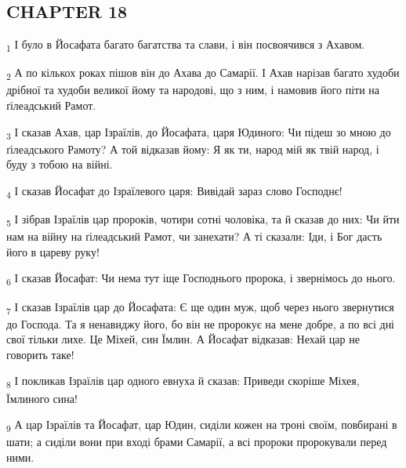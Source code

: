 \subsection{CHAPTER 18}
\begin{tcolorbox}
\textsubscript{1} І було в Йосафата багато багатства та слави, і він посвоячився з Ахавом.
\end{tcolorbox}
\begin{tcolorbox}
\textsubscript{2} А по кількох роках пішов він до Ахава до Самарії. І Ахав нарізав багато худоби дрібної та худоби великої йому та народові, що з ним, і намовив його піти на ґілеадський Рамот.
\end{tcolorbox}
\begin{tcolorbox}
\textsubscript{3} І сказав Ахав, цар Ізраїлів, до Йосафата, царя Юдиного: Чи підеш зо мною до ґілеадського Рамоту? А той відказав йому: Я як ти, народ мій як твій народ, і буду з тобою на війні.
\end{tcolorbox}
\begin{tcolorbox}
\textsubscript{4} І сказав Йосафат до Ізраїлевого царя: Вивідай зараз слово Господнє!
\end{tcolorbox}
\begin{tcolorbox}
\textsubscript{5} І зібрав Ізраїлів цар пророків, чотири сотні чоловіка, та й сказав до них: Чи йти нам на війну на ґілеадський Рамот, чи занехати? А ті сказали: Іди, і Бог дасть його в цареву руку!
\end{tcolorbox}
\begin{tcolorbox}
\textsubscript{6} І сказав Йосафат: Чи нема тут іще Господнього пророка, і звернімось до нього.
\end{tcolorbox}
\begin{tcolorbox}
\textsubscript{7} І сказав Ізраїлів цар до Йосафата: Є ще один муж, щоб через нього звернутися до Господа. Та я ненавиджу його, бо він не пророкує на мене добре, а по всі дні свої тільки лихе. Це Міхей, син Їмлин. А Йосафат відказав: Нехай цар не говорить таке!
\end{tcolorbox}
\begin{tcolorbox}
\textsubscript{8} І покликав Ізраїлів цар одного евнуха й сказав: Приведи скоріше Міхея, Їмлиного сина!
\end{tcolorbox}
\begin{tcolorbox}
\textsubscript{9} А цар Ізраїлів та Йосафат, цар Юдин, сиділи кожен на троні своїм, повбирані в шати; а сиділи вони при вході брами Самарії, а всі пророки пророкували перед ними.
\end{tcolorbox}
